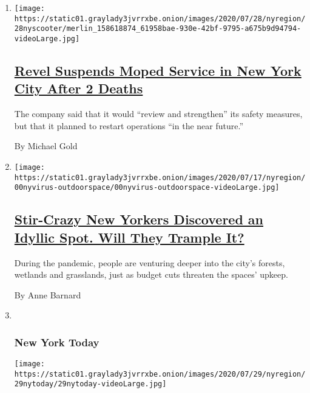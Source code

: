 \begin{enumerate}
\def\labelenumi{\arabic{enumi}.}
\item
  \texttt{[image: https://static01.graylady3jvrrxbe.onion/images/2020/07/28/nyregion/28nyscooter/merlin\_158618874\_61958bae-930e-42bf-9795-a675b9d94794-videoLarge.jpg]}

  \hypertarget{revel-suspends-moped-service-in-new-york-city-after-2-deaths}{%
  \subsection{\texorpdfstring{\href{/2020/07/28/nyregion/revel-scooters-death-nyc.html}{Revel
  Suspends Moped Service in New York City After 2
  Deaths}}{Revel Suspends Moped Service in New York City After 2 Deaths}}\label{revel-suspends-moped-service-in-new-york-city-after-2-deaths}}

  The company said that it would ``review and strengthen'' its safety
  measures, but that it planned to restart operations ``in the near
  future.''

  By Michael Gold
\item
  \texttt{[image: https://static01.graylady3jvrrxbe.onion/images/2020/07/17/nyregion/00nyvirus-outdoorspace/00nyvirus-outdoorspace-videoLarge.jpg]}

  \hypertarget{stir-crazy-new-yorkers-discovered-an-idyllic-spot-will-they-trample-it}{%
  \subsection{\texorpdfstring{\href{/2020/07/28/nyregion/nyc-parks-coronavirus.html}{Stir-Crazy
  New Yorkers Discovered an Idyllic Spot. Will They Trample
  It?}}{Stir-Crazy New Yorkers Discovered an Idyllic Spot. Will They Trample It?}}\label{stir-crazy-new-yorkers-discovered-an-idyllic-spot-will-they-trample-it}}

  During the pandemic, people are venturing deeper into the city's
  forests, wetlands and grasslands, just as budget cuts threaten the
  spaces' upkeep.

  By Anne Barnard
\item ~
  \hypertarget{new-york-today}{%
  \subsubsection{New York Today}\label{new-york-today}}

  \texttt{[image: https://static01.graylady3jvrrxbe.onion/images/2020/07/29/nyregion/29nytoday/29nytoday-videoLarge.jpg]}


\end{enumerate}
